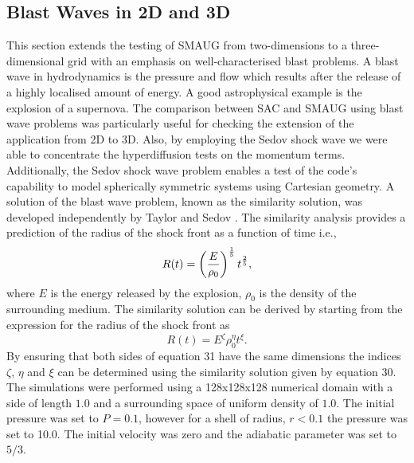 \subsection{Blast Waves in 2D and 3D}
This section extends the testing of SMAUG from two-dimensions to a three-dimensional grid with an emphasis on well-characterised blast problems. A blast wave in hydrodynamics is the pressure and flow which results after the release of a highly localised amount of energy. A good astrophysical example is the explosion of a supernova. The comparison between SAC  and SMAUG using blast wave problems was particularly useful for checking the extension of the application from 2D to 3D. Also, by employing the Sedov shock wave we were able to concentrate the hyperdiffusion tests on the momentum terms. Additionally, the Sedov shock wave problem enables a test of the code's capability to model spherically symmetric systems using Cartesian geometry. A solution of the blast wave problem, known as the similarity solution, was developed independently by Taylor \citep{Taylor 1950} and Sedov \citep{Sedov 1946}. The similarity analysis provides a prediction of the radius of the shock front as a function of time i.e.,
\begin{equation}\label{eqblast1}
R(t)=\left({{E}\over{\rho_{0}}}\right)^{{1}\over{5}}t^{{2}\over{5}},
\end{equation}
where $E$ is the energy released by the explosion, $\rho_{0}$  is the density of the surrounding medium. The similarity solution can be derived by starting from the expression for the radius of the shock front as
\begin{equation}\label{eqblast2}
R(t)=E^{\zeta}\rho_{0}^{\eta}t^{\xi}.
\end{equation}
By ensuring that both sides of equation 31
have the same dimensions the indices $\zeta$, $\eta$ and $\xi$ can be determined using the similarity solution given by equation 30.  
The simulations were performed using a  128x128x128 numerical domain with a side of length $1.0$ and a surrounding space of uniform density of    $\mathrm{1.0}$. The initial pressure was set to $P=0.1$, however for a shell of radius, $r<0.1$ the pressure was set to 10.0.
The initial velocity was zero and the adiabatic parameter was set to $5/3$.



